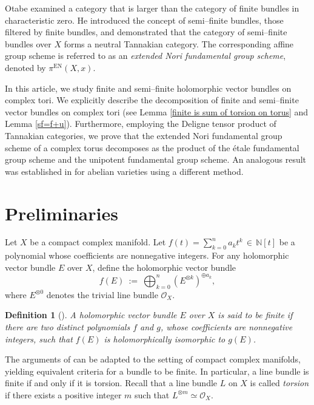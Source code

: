 \documentclass[12pt, reqno]{amsart}
\theoremstyle{plain}
\newtheorem{definition}[theorem]{Definition}
\numberwithin{equation}{section}
\begin{document}
Otabe \cite{Ot} examined a category that is larger than the category of finite bundles in characteristic zero. He introduced the concept of semi--finite bundles, those filtered by finite bundles, and demonstrated that the category of semi--finite bundles over $X$ forms a neutral Tannakian category. The corresponding affine group scheme is referred to as an \emph{extended Nori fundamental group scheme}, denoted by $\pi^{\mathrm{EN}}(X, x)$.

In this article, we study finite and semi--finite holomorphic vector bundles on complex tori. We explicitly describe the decomposition of finite and semi--finite vector bundles on complex tori (see Lemma \ref{finite is sum of torsion on torus} and Lemma \ref{sf=f+u}). Furthermore, employing the Deligne tensor product of Tannakian categories, we prove that the extended Nori fundamental group scheme of a complex torus decomposes as the product of the \'etale fundamental group scheme and the unipotent fundamental group scheme. An analogous result was established in \cite{AA} for abelian varieties using a different method.


\section{Preliminaries}\label{section: Preliminaries}
Let $X$ be a compact complex manifold. 
Let $f(t) = \sum_{k=0}^n a_k t^k\,\in\, \mathbb{N}[t]$ be a polynomial
whose coefficients are nonnegative integers. For any holomorphic vector bundle
$E$ over $X$, define the holomorphic vector bundle
$$
f(E)\ :=\ \bigoplus_{k=0}^n (E^{\otimes k})^{\oplus a_k},
$$
where $E^{\otimes 0}$ denotes the trivial line bundle ${\mathcal O}_X$.

\begin{definition}[{\cite{No}}]\label{def-finite}\rm{
A holomorphic vector bundle $E$ over $X$ is said to be \textit{finite} if there are two distinct polynomials $f$ and $g$,
whose coefficients are nonnegative integers, such that $f(E)$ is holomorphically isomorphic to $g(E)$.
}
\end{definition} 

The arguments of \cite[Chapter I, Lemma 3.1]{No} can be adapted to the setting of compact complex manifolds, yielding equivalent criteria for a bundle to be finite. In particular, a line bundle is finite if and only if it is torsion. Recall that a line bundle $L$ on $X$ is called \emph{torsion} if there exists a positive integer $m$ such that  $L^{\otimes m} \simeq \mathcal{O}_X$.
\end{document}
